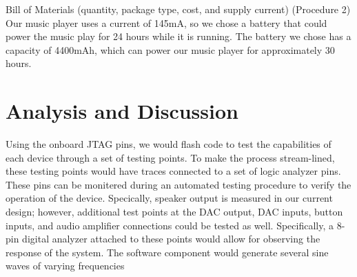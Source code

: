 \documentclass[twoside]{article}
\begin{document}
Bill of Materials (quantity, package type, cost, and supply current) (Procedure 2) \\
Our music player uses a current of 145mA, so we chose a battery that could power the music play for 24 hours while it is running. The battery we chose has a capacity of 4400mAh, which can power our music player for approximately 30 hours.\\


\section*{Analysis and Discussion}
Using the onboard JTAG pins, we would flash code to test the capabilities of each device through a set of testing points. To make the process stream-lined, these testing points would have traces connected to a set of logic analyzer pins. These pins can be monitered during an automated testing procedure to verify the operation of the device. Specically, speaker output is measured in our current design; however, additional test points at the DAC output, DAC inputs, button inputs, and audio amplifier connections could be tested as well. Specifically, a 8-pin digital analyzer attached to these points would allow for observing the response of the system. The software component would generate several sine waves of varying frequencies\\
\end{document}

